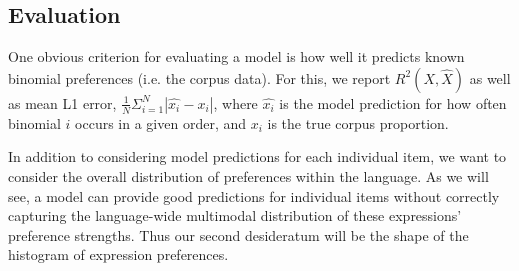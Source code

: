 \documentclass[10pt,letterpaper]{article}
\begin{document}
\subsection{Evaluation}
One obvious criterion for evaluating a model is how well it predicts known binomial preferences (i.e. the corpus data). For this, we report $R^{2}(X,\hat{X})$ as well as mean L1 error, $\frac{1}{N}\Sigma_{i=1}^{N} \left| \hat{x_i} - x_i\right|$, where $\hat{x_i}$ is the model prediction for how often binomial $i$ occurs in a given order, and $x_i$ is the true corpus proportion.

In addition to considering model predictions for each individual item, we want to consider the overall distribution of preferences within the language. As we will see, a model can provide good predictions for individual items without correctly capturing the language-wide multimodal distribution of these expressions' preference strengths. Thus our second desideratum will be the shape of the histogram of expression preferences.

%
%
%
%
\end{document}
